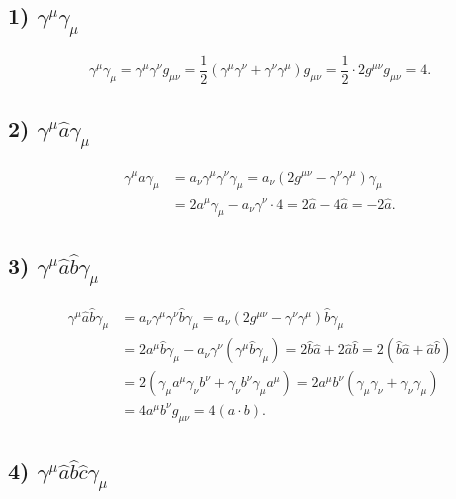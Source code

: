 \documentclass[../final.tex]{subfiles}
\begin{document}
\solution
\subsection*{1) \texorpdfstring{$\gamma^\mu\gamma_\mu$}{γ^μ γ_μ}}

\begin{equation*}
    \gamma^\mu\gamma_\mu=\gamma^\mu\gamma^\nu g_{\mu\nu}
    =\frac12\left(\gamma^\mu\gamma^\nu+\gamma^\nu\gamma^\mu\right)g_{\mu\nu}
    =\frac12\cdot2g^{\mu\nu}g_{\mu\nu}=4.
\end{equation*}

\subsection*{2) \texorpdfstring{$\gamma^\mu\hat a\gamma_\mu$}{γ^μ a γ_μ}}

\begin{align*}
    \gamma^\mu\hat a\gamma_\mu
    &=a_\nu\gamma^\mu\gamma^\nu\gamma_\mu
    =a_\nu\left(2g^{\mu\nu}-\gamma^\nu\gamma^\mu\right)\gamma_\mu\\
    &=2a^\mu\gamma_\mu-a_\nu\gamma^\nu\cdot4
    =2\hat a-4\hat a=-2\hat a.
\end{align*}

\subsection*{3) \texorpdfstring{$\gamma^\mu\hat a\hat b\gamma_\mu$}{γ^μ a b γ_μ}}

\begin{align*}
    \gamma^\mu\hat a\hat b\gamma_\mu
    &=a_\nu\gamma^\mu\gamma^\nu\hat b\gamma_\mu
    =a_\nu\left(2g^{\mu\nu}-\gamma^\nu\gamma^\mu\right)\hat b\gamma_\mu\\
    &=2a^\mu\hat b\gamma_\mu-a_\nu\gamma^\nu\left(\gamma^\mu\hat b\gamma_\mu\right)
    =2\hat b\hat a+2\hat a\hat b
    =2\left(\hat b\hat a+\hat a\hat b\right)\\
    &=2\left(\gamma_\mu a^\mu\gamma_\nu b^\nu+\gamma_\nu b^\nu\gamma_\mu a^\mu\right)
    =2a^\mu b^\nu\left(\gamma_\mu\gamma_\nu+\gamma_\nu\gamma_\mu\right)\\
    &=4a^\mu b^\nu g_{\mu\nu}=4(a\cdot b).
\end{align*}

\subsection*{4) \texorpdfstring{$\gamma^\mu\hat a\hat b\hat c\gamma_\mu$}{γ^μ a b c γ_μ}}
\end{document}
